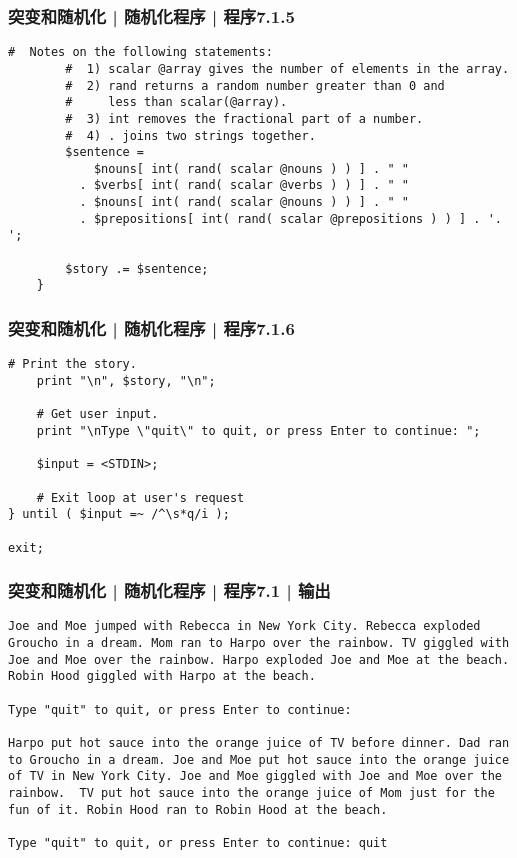 \begin{frame}[fragile]
  \frametitle{突变和随机化 | 随机化程序 | 程序7.1.5}
  \vspace{-1.5em}
\begin{lstlisting}[firstnumber=53,basicstyle=\footnotesize\tt,numberstyle=\scriptsize]
        #  Notes on the following statements:
        #  1) scalar @array gives the number of elements in the array.
        #  2) rand returns a random number greater than 0 and
        #     less than scalar(@array).
        #  3) int removes the fractional part of a number.
        #  4) . joins two strings together.
        $sentence =
            $nouns[ int( rand( scalar @nouns ) ) ] . " "
          . $verbs[ int( rand( scalar @verbs ) ) ] . " "
          . $nouns[ int( rand( scalar @nouns ) ) ] . " "
          . $prepositions[ int( rand( scalar @prepositions ) ) ] . '. ';

        $story .= $sentence;
    }
\end{lstlisting}
\end{frame}

\begin{frame}[fragile]
  \frametitle{突变和随机化 | 随机化程序 | 程序7.1.6}
  \vspace{-1.5em}
\begin{lstlisting}[firstnumber=68]
    # Print the story.
    print "\n", $story, "\n";

    # Get user input.
    print "\nType \"quit\" to quit, or press Enter to continue: ";

    $input = <STDIN>;

    # Exit loop at user's request
} until ( $input =~ /^\s*q/i );

exit;
\end{lstlisting}
\end{frame}

\begin{frame}[fragile]
  \frametitle{突变和随机化 | 随机化程序 | 程序7.1 | 输出}
  \vspace{-1.5em}
\begin{lstlisting}[basicstyle=\footnotesize\tt]
Joe and Moe jumped with Rebecca in New York City. Rebecca exploded Groucho in a dream. Mom ran to Harpo over the rainbow. TV giggled with Joe and Moe over the rainbow. Harpo exploded Joe and Moe at the beach. Robin Hood giggled with Harpo at the beach. 

Type "quit" to quit, or press Enter to continue: 

Harpo put hot sauce into the orange juice of TV before dinner. Dad ran to Groucho in a dream. Joe and Moe put hot sauce into the orange juice of TV in New York City. Joe and Moe giggled with Joe and Moe over the rainbow.  TV put hot sauce into the orange juice of Mom just for the fun of it. Robin Hood ran to Robin Hood at the beach. 

Type "quit" to quit, or press Enter to continue: quit
\end{lstlisting}
\end{frame}

